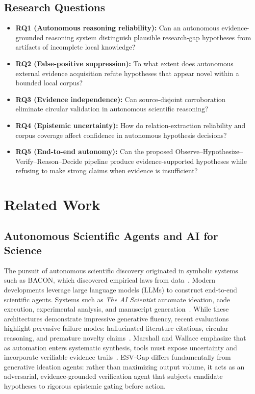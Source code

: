 \documentclass[conference,10pt]{IEEEtran}
\newcommand{\method}{ESV-Gap}
\begin{document}
\subsection*{Research Questions}
\begin{itemize}[leftmargin=1.5em]
  \item \textbf{RQ1 (Autonomous reasoning reliability):} Can an autonomous evidence-grounded reasoning system distinguish plausible research-gap hypotheses from artifacts of incomplete local knowledge?
  \item \textbf{RQ2 (False-positive suppression):} To what extent does autonomous external evidence acquisition refute hypotheses that appear novel within a bounded local corpus?
  \item \textbf{RQ3 (Evidence independence):} Can source-disjoint corroboration eliminate circular validation in autonomous scientific reasoning?
  \item \textbf{RQ4 (Epistemic uncertainty):} How do relation-extraction reliability and corpus coverage affect confidence in autonomous hypothesis decisions?
  \item \textbf{RQ5 (End-to-end autonomy):} Can the proposed Observe--Hypothesize--Verify--Reason--Decide pipeline produce evidence-supported hypotheses while refusing to make strong claims when evidence is insufficient?
\end{itemize}

\section{Related Work}

\subsection{Autonomous Scientific Agents and AI for Science}
The pursuit of autonomous scientific discovery originated in symbolic systems such as BACON, which discovered empirical laws from data~\cite{langley1987}. Modern developments leverage large language models (LLMs) to construct end-to-end scientific agents. Systems such as \emph{The AI Scientist} automate ideation, code execution, experimental analysis, and manuscript generation~\cite{aiscientist}. While these architectures demonstrate impressive generative fluency, recent evaluations highlight pervasive failure modes: hallucinated literature citations, circular reasoning, and premature novelty claims~\cite{wadden,kim2026graphrefine}. Marshall and Wallace emphasize that as automation enters systematic synthesis, tools must expose uncertainty and incorporate verifiable evidence trails~\cite{marshall2019automation}. \method{} differs fundamentally from generative ideation agents: rather than maximizing output volume, it acts as an adversarial, evidence-grounded verification agent that subjects candidate hypotheses to rigorous epistemic gating before action.
\end{document}
